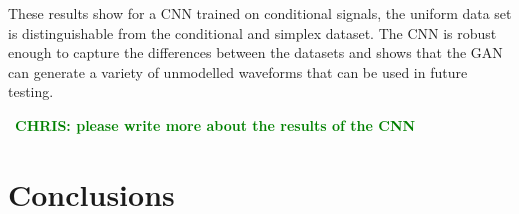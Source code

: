 \documentclass[12pt]{iopart}
\newcommand{\jordan}[1]{\textbf{\textcolor{red}{JORDAN: #1}}}
\newcommand{\chris}[1]{\textbf{\textcolor{green}{CHRIS: #1}}}
\begin{document}
These results show for a \ac{CNN} trained on conditional signals, the uniform data
set is distinguishable from the conditional and simplex dataset. The \ac{CNN} is
robust enough to capture the differences between the datasets and shows that
the GAN can generate a variety of unmodelled waveforms that can be used in
future testing. 

~\chris{please write more about the results of the CNN}

\section{Conclusions}
\end{document}

